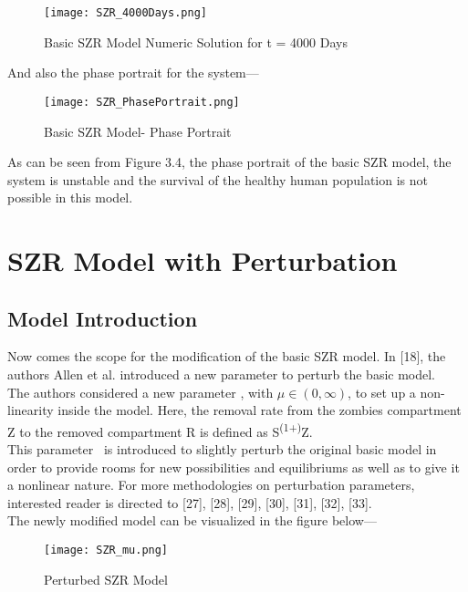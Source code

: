 \begin{figure}[H]
\centering
\texttt{[image: SZR\_4000Days.png]}
\caption{Basic SZR Model Numeric Solution for t = 4000 Days}
\label{fig:Basic SZR 4000 Days}
\end{figure}

And also the phase portrait for the system--- \\

\begin{figure}[H]
\centering
\texttt{[image: SZR\_PhasePortrait.png]}
\caption{Basic SZR Model- Phase Portrait}
\label{fig:Basic SZR Phase Portrait}
\end{figure}

As can be seen from Figure 3.4, the phase portrait of the basic SZR model, the system is unstable and the survival of the healthy human population is not possible in this model. \\

\pagebreak
\section{SZR Model with Perturbation}
\subsection{Model Introduction}

Now comes the scope for the modification of the basic SZR model. In [18], the authors Allen et al. introduced a new parameter to perturb the basic model. \\

The authors considered a new parameter \textmu, with $\mu \in (0, \infty)$, to set up a non-linearity inside the model. Here, the removal rate from the zombies compartment Z to the removed compartment R is defined as \textalpha S\textsuperscript{(1+\textmu)}Z. \\ 

This parameter \textmu \ is introduced to slightly perturb the original basic model in order to provide rooms for new possibilities and equilibriums as well as to give it a nonlinear nature. For more methodologies on perturbation parameters, interested reader is directed to [27], [28], [29], [30], [31], [32], [33]. \\

The newly modified model can be visualized in the figure below--- \\


\begin{figure}[H]
\centering
\texttt{[image: SZR\_mu.png]}
\caption{Perturbed SZR Model}
\label{fig:Perturbed SZR Model}
\end{figure}

